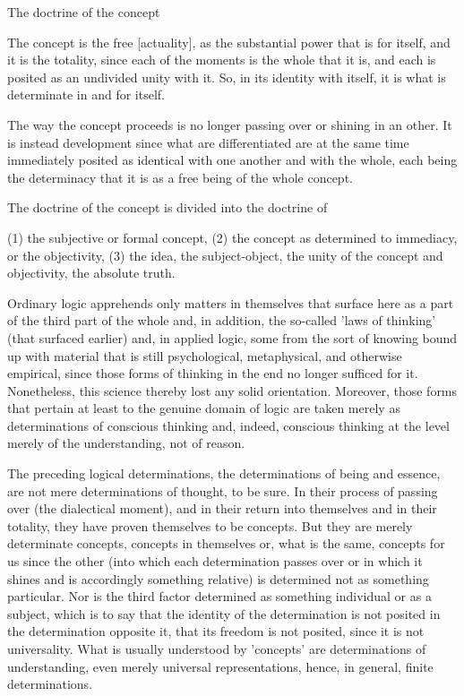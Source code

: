 The doctrine of the concept

The concept is the free [actuality],
as the substantial power that is for itself,
and it is the totality,
since each of the moments is the whole that it is,
and each is posited as an undivided unity with it.
So, in its identity with itself,
it is what is determinate in and for itself.

The way the concept proceeds is
no longer passing over or shining in an other.
It is instead development
since what are differentiated are
at the same time immediately posited as
identical with one another and with the whole,
each being the determinacy that it is
as a free being of the whole concept.

The doctrine of the concept is divided into the doctrine of

(1) the subjective or formal concept,
(2) the concept as determined to immediacy,
    or the objectivity,
(3) the idea,
    the subject-object,
    the unity of the concept and objectivity,
    the absolute truth.

Ordinary logic apprehends only matters in themselves
that surface here as a part of the third part of the whole
and, in addition, the so-called 'laws of thinking' (that surfaced earlier)
and, in applied logic, some from the sort of knowing bound up with material
that is still psychological, metaphysical, and otherwise empirical,
since those forms of thinking in the end no longer sufficed for it.
Nonetheless, this science thereby lost any solid orientation.
Moreover, those forms that pertain at least to the genuine domain of logic
are taken merely as determinations of conscious thinking
and, indeed, conscious thinking at the level
merely  of the understanding, not of reason.

The preceding logical determinations,
the determinations of being and essence,
are not mere determinations of thought, to be sure.
In their process of passing over (the dialectical moment),
and in their return into themselves and in their totality,
they have proven themselves to be concepts.
But they are merely determinate concepts,
concepts in themselves or, what is the same,
concepts for us since the other
(into which each determination passes over
or in which it shines and is accordingly something relative)
is determined not as something particular.
Nor is the third factor determined as
something individual or as a subject,
which is to say that the identity of the determination is
not posited in the determination opposite it,
that its freedom is not posited,
since it is not universality.
What is usually understood by 'concepts' are
determinations of understanding,
even merely universal representations,
hence, in general, finite determinations.

